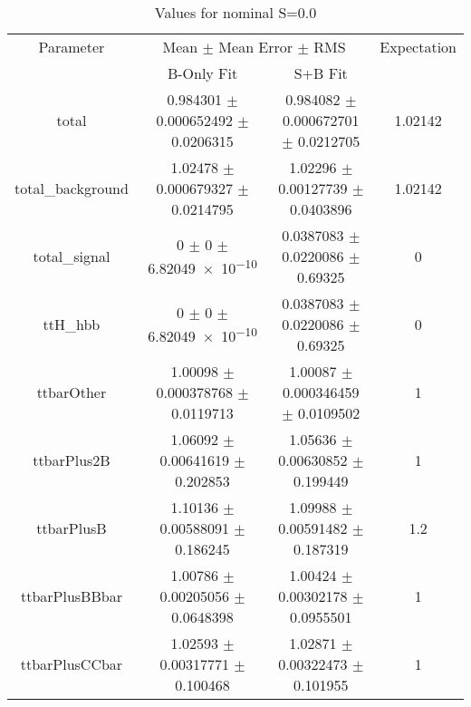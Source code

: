 \begin{table}
\centering
\caption{Values for nominal S=0.0}
\begin{tabular}{cccc}
\toprule
Parameter & \multicolumn{2}{c}{Mean $\pm$ Mean Error $\pm$ RMS} & Expectation\\
 & B-Only Fit & S+B Fit & \\
\midrule
total & \num{0.984301} $\pm$ \num{0.000652492} $\pm$ \num{0.0206315} & \num{0.984082} $\pm$ \num{0.000672701} $\pm$ \num{0.0212705} & \num{1.02142}\\
total\_background & \num{1.02478} $\pm$ \num{0.000679327} $\pm$ \num{0.0214795} & \num{1.02296} $\pm$ \num{0.00127739} $\pm$ \num{0.0403896} & \num{1.02142}\\
total\_signal & \num{0} $\pm$ \num{0} $\pm$ \num{6.82049e-10} & \num{0.0387083} $\pm$ \num{0.0220086} $\pm$ \num{0.69325} & \num{0}\\
ttH\_hbb & \num{0} $\pm$ \num{0} $\pm$ \num{6.82049e-10} & \num{0.0387083} $\pm$ \num{0.0220086} $\pm$ \num{0.69325} & \num{0}\\
ttbarOther & \num{1.00098} $\pm$ \num{0.000378768} $\pm$ \num{0.0119713} & \num{1.00087} $\pm$ \num{0.000346459} $\pm$ \num{0.0109502} & \num{1}\\
ttbarPlus2B & \num{1.06092} $\pm$ \num{0.00641619} $\pm$ \num{0.202853} & \num{1.05636} $\pm$ \num{0.00630852} $\pm$ \num{0.199449} & \num{1}\\
ttbarPlusB & \num{1.10136} $\pm$ \num{0.00588091} $\pm$ \num{0.186245} & \num{1.09988} $\pm$ \num{0.00591482} $\pm$ \num{0.187319} & \num{1.2}\\
ttbarPlusBBbar & \num{1.00786} $\pm$ \num{0.00205056} $\pm$ \num{0.0648398} & \num{1.00424} $\pm$ \num{0.00302178} $\pm$ \num{0.0955501} & \num{1}\\
ttbarPlusCCbar & \num{1.02593} $\pm$ \num{0.00317771} $\pm$ \num{0.100468} & \num{1.02871} $\pm$ \num{0.00322473} $\pm$ \num{0.101955} & \num{1}\\
\bottomrule
\end{tabular}
\end{table}
